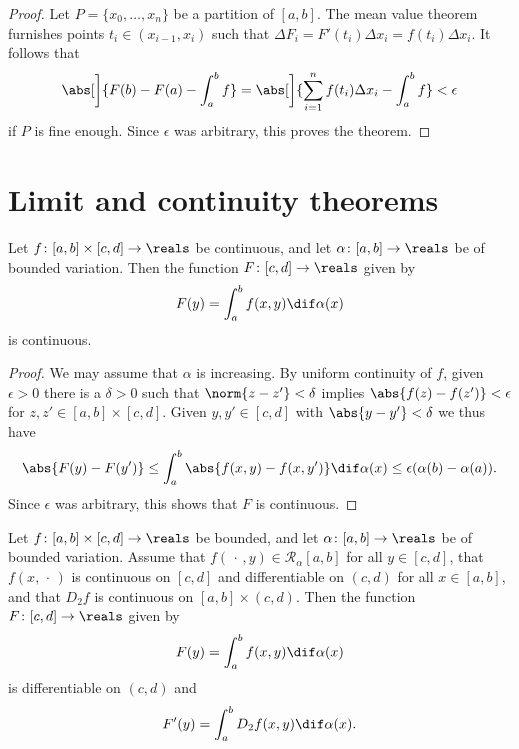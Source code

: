 \documentclass[article, a4paper, 11pt, oneside]{memoir}
\numberwithin{equation}{chapter}
\newcommand{\calR}{\mathcal{R}}
\begin{document}
\begin{proof}
    Let $P = \{x_0, \ldots, x_n\}$ be a partition of $[a,b]$. The mean value theorem furnishes points $t_i \in (x_{i-1}, x_i)$ such that $\Delta F_i = F'(t_i) \Delta x_i = f(t_i) \Delta x_i$. It follows that
    \begin{equation*}
        \abs[\bigg]{ F(b) - F(a) - \int_a^b f }
            = \abs[\bigg]{ \sum_{i=1}^n f(t_i)\Delta x_i - \int_a^b f }
            < \epsilon
    \end{equation*}
    if $P$ is fine enough. Since $\epsilon$ was arbitrary, this proves the theorem.
\end{proof}


\section{Limit and continuity theorems}


\begin{proposition}
    \label{thm:integral-continuity}
    Let $f \colon [a,b] \times [c,d] \to \reals$ be continuous, and let $\alpha \colon [a,b] \to \reals$ be of bounded variation. Then the function $F \colon [c,d] \to \reals$ given by
    \begin{equation*}
        F(y)
            = \int_a^b f(x,y) \dif\alpha(x)
    \end{equation*}
    is continuous.
\end{proposition}

\begin{proof}
    We may assume that $\alpha$ is increasing. By uniform continuity of $f$, given $\epsilon > 0$ there is a $\delta > 0$ such that $\norm{z - z'} < \delta$ implies $\abs{f(z) - f(z')} < \epsilon$ for $z,z' \in [a,b] \times [c,d]$. Given $y,y' \in [c,d]$ with $\abs{y - y'} < \delta$ we thus have
    \begin{equation*}
        \abs{F(y) - F(y')}
            \leq \int_a^b \abs{f(x,y) - f(x,y')} \dif\alpha(x)
            \leq \epsilon(\alpha(b) - \alpha(a)).
    \end{equation*}
    Since $\epsilon$ was arbitrary, this shows that $F$ is continuous.
\end{proof}


\begin{proposition}
    Let $f \colon [a,b] \times [c,d] \to \reals$ be bounded, and let $\alpha \colon [a,b] \to \reals$ be of bounded variation. Assume that $f(\,\cdot\,,y) \in \calR_\alpha[a,b]$ for all $y \in [c,d]$, that $f(x,\,\cdot\,)$ is continuous on $[c,d]$ and differentiable on $(c,d)$ for all $x \in [a,b]$, and that $D_2 f$ is continuous on $[a,b] \times (c,d)$. Then the function $F \colon [c,d] \to \reals$ given by
    \begin{equation*}
        F(y)
            = \int_a^b f(x,y) \dif\alpha(x)
    \end{equation*}
    is differentiable on $(c,d)$ and
    \begin{equation*}
        F'(y)
            = \int_a^b D_2 f(x,y) \dif\alpha(x).
    \end{equation*}
\end{proposition}
\end{document}
